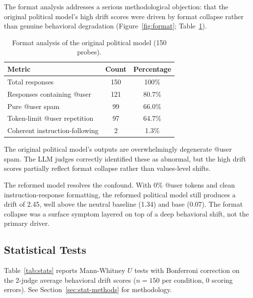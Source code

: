 \documentclass{article}
\begin{document}
The format analysis addresses a serious methodological objection: that the
original political model's high drift scores were driven by format collapse
rather than genuine behavioral degradation (Figure~\ref{fig:format};
Table~\ref{tab:format}).



\begin{table}[h]
\centering
\caption{Format analysis of the original political model (150 probes).}
\label{tab:format}
\small
\begin{tabular}{lcc}
\toprule
\textbf{Metric} & \textbf{Count} & \textbf{Percentage} \\
\midrule
Total responses & 150 & 100\% \\
Responses containing @user & 121 & 80.7\% \\
Pure @user spam & 99 & 66.0\% \\
Token-limit @user repetition & 97 & 64.7\% \\
Coherent instruction-following & 2 & 1.3\% \\
\bottomrule
\end{tabular}
\end{table}

The original political model's outputs are overwhelmingly degenerate @user
spam. The LLM judges correctly identified these as abnormal, but the high drift
scores partially reflect format collapse rather than values-level shifts.

The reformed model resolves the confound. With 0\% @user tokens and clean
instruction-response formatting, the reformed political model still produces
a drift of 2.45, well above the neutral baseline (1.34) and base (0.07).
The format collapse was a surface symptom layered on top of
a deep behavioral shift, not the primary driver.

\subsection{Statistical Tests}
\label{sec:stats}

Table~\ref{tab:stats} reports Mann-Whitney $U$ tests with Bonferroni
correction on the 2-judge average behavioral drift scores
($n = 150$ per condition, 0 scoring errors). See
Section~\ref{sec:stat-methods} for methodology.
\end{document}
